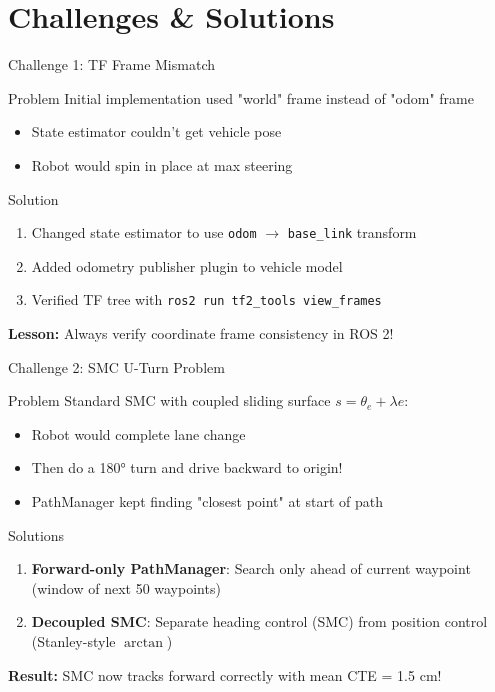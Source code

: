 \documentclass[10pt]{beamer}
\begin{document}
\section{Challenges \& Solutions}

\begin{frame}{Challenge 1: TF Frame Mismatch}
  \begin{alertblock}{Problem}
    Initial implementation used "world" frame instead of "odom" frame
    \begin{itemize}
      \item State estimator couldn't get vehicle pose
      \item Robot would spin in place at max steering
    \end{itemize}
  \end{alertblock}

  \begin{block}{Solution}
    \begin{enumerate}
      \item Changed state estimator to use \texttt{odom} $\to$ \texttt{base\_link} transform
      \item Added odometry publisher plugin to vehicle model
      \item Verified TF tree with \texttt{ros2 run tf2\_tools view\_frames}
    \end{enumerate}
  \end{block}

  \textbf{Lesson:} Always verify coordinate frame consistency in ROS 2!
\end{frame}

\begin{frame}{Challenge 2: SMC U-Turn Problem}
  \begin{alertblock}{Problem}
    Standard SMC with coupled sliding surface $s = \theta_e + \lambda e$:
    \begin{itemize}
      \item Robot would complete lane change
      \item Then do a 180° turn and drive backward to origin!
      \item PathManager kept finding "closest point" at start of path
    \end{itemize}
  \end{alertblock}

  \begin{block}{Solutions}
    \begin{enumerate}
      \item \textbf{Forward-only PathManager}: Search only ahead of current waypoint (window of next 50 waypoints)
      \item \textbf{Decoupled SMC}: Separate heading control (SMC) from position control (Stanley-style $\arctan$)
    \end{enumerate}
  \end{block}

  \textbf{Result:} SMC now tracks forward correctly with mean CTE = 1.5 cm!
\end{frame}
\end{document}
